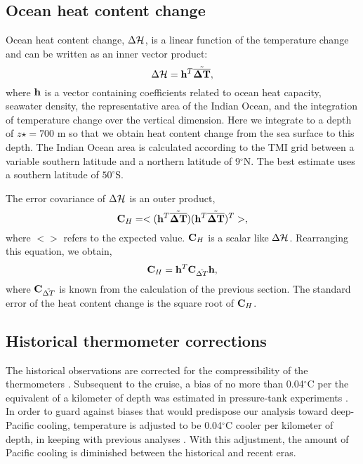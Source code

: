 \documentclass[12pt]{article}
\begin{document}
\subsection{Ocean heat content change}

Ocean heat content change, $\Delta {\cal H}$, is a linear function of
the temperature change and can be written as an inner vector product:
\begin{equation}
\Delta {\cal H} = {\bf h}^T \tilde{\overline{{\boldsymbol \Delta}{\bf T}}},
\end{equation}
where ${\bf h}$ is a vector containing coefficients related to ocean
heat capacity, seawater density, the representative area of the Indian
Ocean, and the integration of temperature change over the vertical
dimension. Here we integrate to a depth of $z\star = 700$ m so that we
obtain heat content change from the sea surface to this depth. The
Indian Ocean area is calculated according to the TMI grid between a
variable southern latitude and a northern latitude of 9$^{\circ}$N. The best estimate uses a
southern latitude of $50^\circ$S.
  
The error covariance of $\Delta {\cal H}$ is an outer product, 
\begin{equation}
\mbox{{\bf C}}_{H} = <({\bf h}^T \tilde{\overline{{\boldsymbol \Delta}{\bf T}}})({\bf h}^T \tilde{\overline{{\boldsymbol \Delta}{\bf T}}})^T>,
\end{equation}
where $<>$ refers to the expected value. ${\bf C}_H$ is a scalar like $\Delta {\cal H}$.
Rearranging this equation, we obtain, 
\begin{equation}
\mbox{{\bf C}}_{H} =  {\bf h}^T \mbox{{\bf C}}_{{\tilde{\Delta T}}} {\bf h},
\end{equation}
where $\mbox{{\bf C}}_{{\tilde{\Delta T}}}$ is known from the
calculation of the previous section. The standard error of the heat
content change is the square root of $\mbox{{\bf C}}_{H}$.

\subsection{Historical thermometer corrections}

The historical observations are corrected for the
compressibility of the thermometers \cite{Tait--1882:Pressure}.
Subsequent to the cruise, a bias of no more than 0.04$^\circ$C per the
equivalent of a kilometer of depth was estimated in pressure-tank
experiments \cite{Tait--1882:Pressure}. In order to guard against
biases that would predispose our analysis toward deep-Pacific cooling,
temperature is adjusted to be 0.04$^\circ$C cooler per kilometer of
depth, in keeping with previous analyses
\cite{Roemmich-Gould-2012:135}. With this adjustment, the amount of
Pacific cooling is diminished between the historical and recent eras.
\end{document}
